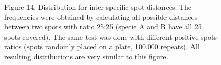 \documentclass[letterpaper,10pt,english]{sphinxmanual}
\begin{document}
\begin{figure}[htbp]
\centering
\capstart

\caption{Figure 14. Distribution for inter-specific spot distances. The
frequencies were obtained by calculating all possible distances
between two spots with ratio 25:25 (specie A and B have all 25 spots
covered). The same test was done with different positive spots
ratios (spots randomly placed on a plate, 100.000 repeats). All
resulting distributions are very similar to this figure.}\label{user_manual:fig-distance-distribution-inter}\end{figure}
\end{document}
